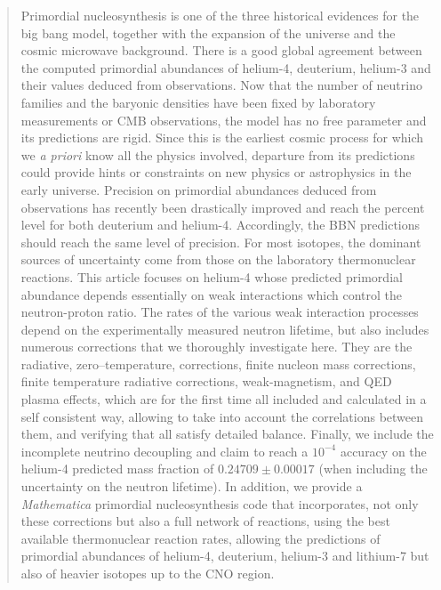 \documentclass[onecolumn,float,floatfix,preprintnumbers,aps,rmp,nofootinbib,amsmath,amssymb,amsfonts,superscriptaddress,tightenlines]{revtex4}
\begin{document}
\begin{abstract}
Primordial nucleosynthesis is one of the three historical evidences for the big bang model, together with the expansion of the universe
and the cosmic microwave background. There is a good global agreement
between the computed primordial abundances of helium-4, deuterium, helium-3 and their values deduced from observations. Now that the number of neutrino families
and the baryonic densities have been fixed by laboratory measurements
or CMB observations, the model has no free parameter and its predictions are rigid.
Since this is the earliest cosmic process for which we  {\it a priori} know all the physics involved,  departure from 
its predictions could provide hints or constraints on new physics or
astrophysics in the early universe. Precision on primordial abundances deduced from 
observations has recently been drastically improved and reach the percent level for both deuterium and helium-4.  
Accordingly, the BBN predictions should reach the same level of
precision. For most isotopes, the dominant sources of uncertainty
come from those on the laboratory thermonuclear reactions. This
article focuses on helium-4 whose predicted primordial abundance depends
essentially on weak interactions which control the neutron-proton
ratio. The rates of the various weak interaction processes depend on
the experimentally measured neutron lifetime, but also includes
numerous corrections that we thoroughly investigate here. They are the radiative, zero--temperature,  corrections, finite nucleon mass  corrections, finite temperature radiative corrections,
weak-magnetism, and QED plasma effects, which are for the first time all included and calculated in a self consistent way, allowing
to take into account the correlations between them, and verifying that all satisfy detailed balance. 
Finally, we include the incomplete neutrino decoupling and claim to reach a $10^{-4}$
accuracy on the helium-4 predicted mass fraction of $0.24709\pm0.00017$ (when including the uncertainty on the neutron lifetime). 
In addition, we provide a {\it Mathematica} primordial nucleosynthesis code that incorporates,
not only these corrections but also a full network of reactions, using
the best available thermonuclear reaction rates, allowing the predictions of primordial abundances of helium-4, deuterium, helium-3
and lithium-7 but also of heavier isotopes up to the CNO region.  
\end{abstract}
\maketitle
\end{document}
